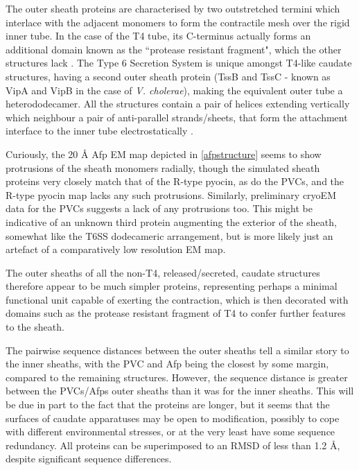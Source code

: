 The outer sheath proteins are characterised by two outstretched termini which interlace with the adjacent monomers to form the contractile mesh over the rigid inner tube. In the case of the T4 tube, its C-terminus actually forms an additional domain known as the ``protease resistant fragment", which the other structures lack \citep{Aksyuk2009}. The Type 6 Secretion System is unique amongst T4-like caudate structures, having a second outer sheath protein (TssB and TssC - known as VipA and VipB in the case of \emph{V. cholerae}), making the equivalent outer tube a heterododecamer. All the structures contain a pair of helices extending vertically which neighbour a pair of anti-parallel strands/sheets, that form the attachment interface to the inner tube electrostatically \citep{Ge2015}.

Curiously, the 20 \AA{} Afp EM map depicted in \vref{afpstructure} seems to show protrusions of the sheath monomers radially, though the simulated sheath proteins very closely match that of the R-type pyocin, as do the PVCs, and the R-type pyocin map lacks any such protrusions. Similarly, preliminary cryoEM data for the PVCs suggests a lack of any protrusions too. This might be indicative of an unknown third protein augmenting the exterior of the sheath, somewhat like the T6SS dodecameric arrangement, but is more likely just an artefact of a comparatively low resolution EM map.

The outer sheaths of all the non-T4, released/secreted, caudate structures therefore appear to be much simpler proteins, representing perhaps a minimal functional unit capable of exerting the contraction, which is then decorated with domains such as the protease resistant fragment of T4 to confer further features to the sheath.

The pairwise sequence distances between the outer sheaths tell a similar story to the inner sheaths, with the PVC and Afp being the closest by some margin, compared to the remaining structures. However, the sequence distance is greater between the PVCs/Afps outer sheaths than it was for the inner sheaths. This will be due in part to the fact that the proteins are longer, but it seems that the surfaces of caudate apparatuses may be open to modification, possibly to cope with different environmental stresses, or at the very least have some sequence redundancy. All proteins can be superimposed to an RMSD of less than 1.2 \AA, despite significant sequence differences.

